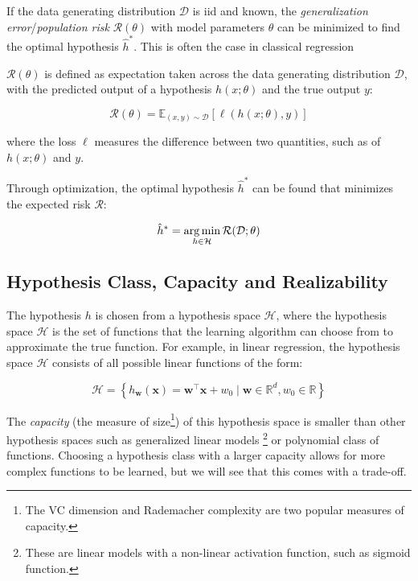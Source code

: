 If the data generating distribution $\mathcal{D}$ is \gls{iid} and known, the \textit{generalization error}/\textit{population risk} $\mathcal{R}(\theta)$ with model parameters $\theta$ can be minimized to find the optimal hypothesis $\hat{h}^*$. This is often the case in classical regression 

$\mathcal{R}(\theta)$ is defined as expectation taken across the data generating distribution $\mathcal{D}$, with the predicted output of a hypothesis $h(x; \theta)$ and the true output $y$:

\begin{equation}
    \mathcal{R}(\theta) = \mathbb{E}_{(x, y) \sim \mathcal{D}} \left[ \ell(h(x; \theta), y) \right]
\end{equation}

where the loss $\ell$ measures the difference between two quantities, such as of $h(x; \theta)$ and $y$.

Through optimization, the optimal hypothesis $\hat{h}^*$ can be found that minimizes the expected risk $\mathcal{R}$:

\begin{equation}
    \hat{h}^* = \operatorname*{arg\,min}_{h \in \mathcal{H}} \mathcal{R}(\mathcal{D}; \theta)
\end{equation}

\subsection{Hypothesis Class, Capacity and Realizability}
The hypothesis $h$ is chosen from a hypothesis space $\mathcal{H}$, where the hypothesis space $\mathcal{H}$ is the set of functions that the learning algorithm can choose from to approximate the true function. 
For example, in linear regression, the hypothesis space $\mathcal{H}$ consists of all possible linear functions of the form:

\begin{equation*}
   \mathcal{H} =  \left\{ h_{\mathbf{w}}(\mathbf{x}) = \mathbf{w}^\top \mathbf{x} + w_0 \mid \mathbf{w} \in \mathbb{R}^d, w_0 \in \mathbb{R} \right\}
\end{equation*}

The \textit{capacity} (the measure of size\footnote{The VC dimension and Rademacher complexity are two popular measures of capacity.}) of this hypothesis space is smaller than other hypothesis spaces such as generalized linear models
\footnote{These are linear models with a non-linear activation function, such as sigmoid function.} 
or polynomial class of functions. Choosing a hypothesis class with a larger capacity allows for more complex functions to be learned, but we will see that this comes with a trade-off.

